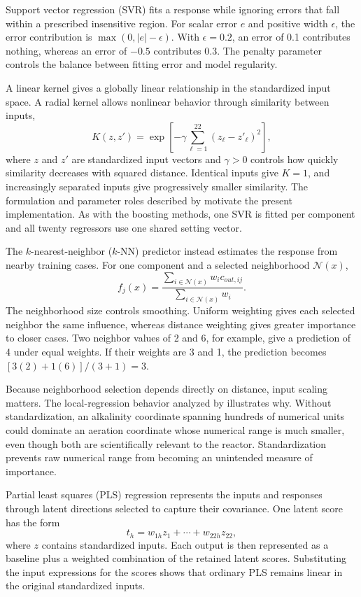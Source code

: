 Support vector regression (SVR) fits a response while ignoring errors that fall within a prescribed insensitive region. For scalar error $e$ and positive width $\epsilon$, the error contribution is
$\max(0,|e|-\epsilon)$.
With $\epsilon=0.2$, an error of 0.1 contributes nothing, whereas an error of $-0.5$ contributes 0.3. The penalty parameter controls the balance between fitting error and model regularity.

A linear kernel gives a globally linear relationship in the standardized input space. A radial kernel allows nonlinear behavior through similarity between inputs,
\[
K(z,z')=\exp\!\left[-\gamma\sum_{\ell=1}^{22}(z_\ell-z'_\ell)^2\right],
\]
where $z$ and $z'$ are standardized input vectors and $\gamma>0$ controls how quickly similarity decreases with squared distance. Identical inputs give $K=1$, and increasingly separated inputs give progressively smaller similarity. The formulation and parameter roles described by \citet{SmolaScholkopf2004} motivate the present implementation. As with the boosting methods, one SVR is fitted per component and all twenty regressors use one shared setting vector.

The $k$-nearest-neighbor ($k$-NN) predictor instead estimates the response from nearby training cases. For one component and a selected neighborhood $\mathcal N(x)$,
\[
f_j(x)=\frac{\sum_{i\in\mathcal N(x)}w_i c_{out,ij}}
{\sum_{i\in\mathcal N(x)}w_i}.
\]
The neighborhood size controls smoothing. Uniform weighting gives each selected neighbor the same influence, whereas distance weighting gives greater importance to closer cases. Two neighbor values of 2 and 6, for example, give a prediction of 4 under equal weights. If their weights are 3 and 1, the prediction becomes
$[3(2)+1(6)]/(3+1)=3$.

Because neighborhood selection depends directly on distance, input scaling matters. The local-regression behavior analyzed by \citet{Mack1981} illustrates why. Without standardization, an alkalinity coordinate spanning hundreds of numerical units could dominate an aeration coordinate whose numerical range is much smaller, even though both are scientifically relevant to the reactor. Standardization prevents raw numerical range from becoming an unintended measure of importance.

Partial least squares (PLS) regression represents the inputs and responses through latent directions selected to capture their covariance. One latent score has the form
\[
t_h=w_{1h}z_1+\cdots+w_{22h}z_{22},
\]
where $z$ contains standardized inputs. Each output is then represented as a baseline plus a weighted combination of the retained latent scores. Substituting the input expressions for the scores shows that ordinary PLS remains linear in the original standardized inputs.

